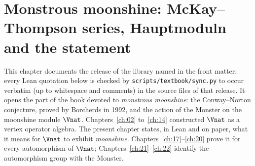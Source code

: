 \chapter{Monstrous moonshine: McKay--Thompson series, Hauptmoduln and the statement}\label{ch:16}

\providecommand{\chsixteenH}{\mathbb{H}}
\providecommand{\chsixteenR}{\mathbb{R}}
\providecommand{\chsixteenM}{\mathbb{M}}
\providecommand{\chsixteenSL}{\mathrm{SL}_2(\mathbb{Z})}
\providecommand{\chsixteenSLR}{\mathrm{SL}_2(\mathbb{R})}
\providecommand{\chsixteenGLR}{\mathrm{GL}_2(\mathbb{R})}
\providecommand{\chsixteenP}{\mathbb{P}^1}
\providecommand{\chsixteenX}{X(\Gamma)}
\providecommand{\chsixteenT}{T_g}
\providecommand{\chsixteenmat}[4]{\left(\begin{smallmatrix}#1&#2\\#3&#4\end{smallmatrix}\right)}
\providecommand{\chsixteenlean}[1]{\texttt{\directlua{ local s = "\luaescapestring{\detokenize{#1}}" for piece, sep in string.gmatch(s, "([^_.]*)([_.]?)") do if not (piece == "" and sep == "") then tex.sprint(-2, piece .. sep) if not (sep == "") then tex.sprint(string.char(92) .. "allowbreak{}") end end end}}}
\begingroup\setlength{\emergencystretch}{3em}\sloppy

This chapter documents the release of the library named in the front matter; every Lean quotation below is checked by
\texttt{scripts/textbook/sync.py} to occur verbatim (up to whitespace and comments) in the source files of that
release.  It
opens the part of the book devoted to \emph{monstrous moonshine}: the Conway--Norton conjecture, proved by
Borcherds in 1992, and the action of the Monster on the moonshine module $\Vnat$.  Chapters~\ref{ch:02}
to~\ref{ch:14} constructed $\Vnat$ as a vertex operator algebra.  The present chapter states, in Lean and on paper,
what it means for $\Vnat$ to exhibit \emph{moonshine}.  Chapters~\ref{ch:17}--\ref{ch:20} prove it for every
automorphism of $\Vnat$; Chapters~\ref{ch:21}--\ref{ch:22} identify the automorphism group with the Monster.

